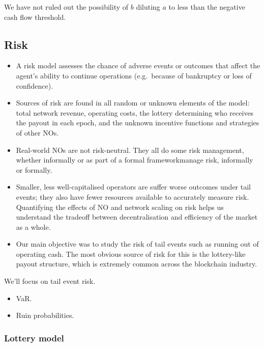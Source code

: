 We have not ruled out the possibility of $b$ diluting $a$ to less than the negative cash flow threshold.



\newpage
\subsection{Risk}

\begin{itemize}
  \item
    A risk model assesses the chance of adverse events or outcomes that affect the agent's ability to continue operations (e.g.~because of bankruptcy or loss of confidence).
  \item
    Sources of risk are found in all random or unknown elements of the model: total network revenue, operating costs, the lottery determining who receives the payout in each epoch, and the unknown incentive functions and strategies of other NOs.
  \item
    Real-world NOs are not risk-neutral. They all do some risk management, whether informally or as part of a formal frameworkmanage risk, informally or formally.
  \item
    Smaller, less well-capitalised operators are suffer worse outcomes under tail events; they also have fewer resources available to accurately measure risk.
    Quantifying the effects of NO and network scaling on risk helps us understand the tradeoff between decentralisation and efficiency of the market as a whole.
  \item
    Our main objective was to study the risk of tail events such as running out of operating cash.
    The most obvious source of risk for this is the lottery-like payout structure, which is extremely common across the blockchain industry.
\end{itemize}


We'll focus on tail event risk.
\begin{itemize}

  \item VaR.
  \item Ruin probabilities.

\end{itemize}

\subsubsection{Lottery model}


